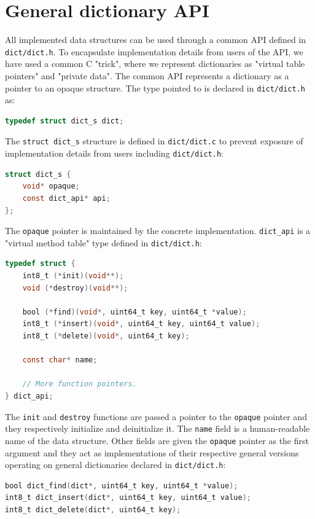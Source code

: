 \section{General dictionary API}
All implemented data structures can be used through a common API defined
in \texttt{dict/dict.h}. To encapsulate implementation details from
users of the API, we have used a common C "trick", where we represent
dictionaries as "virtual table pointers" and "private data".
The common API represents a dictionary as a pointer to an opaque structure.
The type pointed to is declared in \texttt{dict/dict.h} as:
\begin{lstlisting}[language=C]
typedef struct dict_s dict;
\end{lstlisting}

The \texttt{struct dict\_s} structure is defined in \texttt{dict/dict.c}
to prevent exposure of implementation details from users including
\texttt{dict/dict.h}:
\begin{lstlisting}[language=C]
struct dict_s {
	void* opaque;
	const dict_api* api;
};
\end{lstlisting}

The \texttt{opaque} pointer is maintained by the concrete implementation.
\texttt{dict\_api} is a "virtual method table" type defined in
\texttt{dict/dict.h}:

\begin{lstlisting}[language=C]
typedef struct {
	int8_t (*init)(void**);
	void (*destroy)(void**);

	bool (*find)(void*, uint64_t key, uint64_t *value);
	int8_t (*insert)(void*, uint64_t key, uint64_t value);
	int8_t (*delete)(void*, uint64_t key);

	const char* name;

	// More function pointers.
} dict_api;
\end{lstlisting}

The \texttt{init} and \texttt{destroy} functions are passed a pointer to the
\texttt{opaque} pointer and they respectively initialize and deinitialize it.
The \texttt{name} field is a human-readable name of the data structure.
Other fields are given the \texttt{opaque} pointer as the first argument
and they act as implementations of their respective general versions operating
on general dictionaries declared in \texttt{dict/dict.h}:

\begin{lstlisting}[language=C]
bool dict_find(dict*, uint64_t key, uint64_t *value);
int8_t dict_insert(dict*, uint64_t key, uint64_t value);
int8_t dict_delete(dict*, uint64_t key);
\end{lstlisting}


